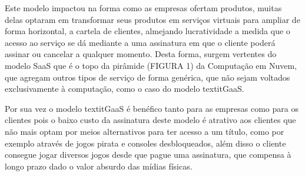 \begin{justify}
    Este modelo impactou na forma como as empresas ofertam produtos, muitas delas optaram em
    transformar seus produtos em serviços virtuais para ampliar de forma horizontal, a cartela de
    clientes, almejando lucratividade a medida que o acesso ao serviço se dá mediante a uma
    assinatura em que o cliente poderá assinar ou cancelar a qualquer momento.
    Desta forma, surgem vertentes do modelo SaaS que é o topo da pirâmide (FIGURA 1) da Computação
    em Nuvem, que agregam outros tipos de serviço de forma genérica, que não sejam voltados
    exclusivamente à computação, como o caso do modelo textit{GaaS}.
    
    Por sua vez o modelo textit{GaaS} é benéfico tanto para as empresas como para os clientes pois o
    baixo custo da assinatura deste modelo é atrativo aos clientes que não mais optam por meios
    alternativos para ter acesso a um título, como por exemplo através de jogos pirata e consoles
    desbloqueados, além disso o cliente consegue jogar diversos jogos desde que pague uma
    assinatura, que compensa à longo prazo dado o valor absurdo das mídias físicas.


\end{justify}